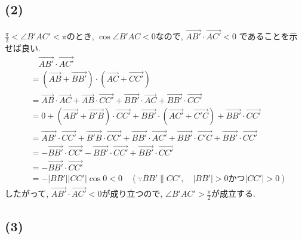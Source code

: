 \documentclass[a4j, 11pt]{jarticle}
\begin{document}
\subsection*{(2)}
$\frac{\pi}{2} < \angle B'AC' < \pi$のとき, $\cos \angle B'AC < 0$なので,
$\overrightarrow{AB'} \cdot \overrightarrow{AC'} < 0$
であることを示せば良い.
\begin{align*}
	&\quad \overrightarrow{AB'} \cdot \overrightarrow{AC'} \\
	&= (\overrightarrow{AB} + \overrightarrow{BB'}) \cdot
	(\overrightarrow{AC} + \overrightarrow{CC'}) \\
	&= \overrightarrow{AB} \cdot \overrightarrow{AC}
	+ \overrightarrow{AB} \cdot \overrightarrow{CC'}
	+ \overrightarrow{BB'} \cdot \overrightarrow{AC}
	+ \overrightarrow{BB'} \cdot \overrightarrow{CC'} \\
	&= 0 + (\overrightarrow{AB'} + \overrightarrow{B'B}) \cdot
	\overrightarrow{CC'} + \overrightarrow{BB'} \cdot
	(\overrightarrow{AC'} + \overrightarrow{C'C})
	+ \overrightarrow{BB'} \cdot \overrightarrow{CC'} \\
	&= \overrightarrow{AB'} \cdot \overrightarrow{CC'}
	+ \overrightarrow{B'B} \cdot \overrightarrow{CC'}
	+ \overrightarrow{BB'} \cdot \overrightarrow{AC'}
	+ \overrightarrow{BB'} \cdot \overrightarrow{C'C}
	+ \overrightarrow{BB'} \cdot \overrightarrow{CC'} \\
	&= - \overrightarrow{BB'} \cdot \overrightarrow{CC'}
	- \overrightarrow{BB'} \cdot \overrightarrow{CC'}
	+ \overrightarrow{BB'} \cdot \overrightarrow{CC'} \\
	&= - \overrightarrow{BB'} \cdot \overrightarrow{CC'} \\
	&= - |BB'| |CC'| \cos 0 < 0
	\quad (\because BB' \parallel CC', 
	\quad |BB'| > 0 \text{かつ} |CC'| > 0)
\end{align*}
したがって, 
$\overrightarrow{AB'} \cdot \overrightarrow{AC'} < 0$が成り立つので, 
$\angle B'AC' > \frac{\pi}{2}$が成立する.
\subsection*{(3)}
%
%

%
%
\end{document}
